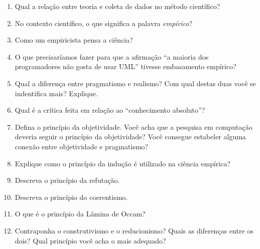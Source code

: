 \documentclass{article}
\begin{document}
\begin{enumerate}

    \item Qual a relação entre teoria e coleta de dados no método científico?
    \item No contexto científico, o que significa a palavra \textit{empírico}?
    \item Como um empiricista pensa a ciência? 
    \item O que precisaríamos fazer para que a afirmação ``a maioria dos programadores não gosta de usar UML'' tivesse embasamento empírico?
    \item Qual a diferença entre pragmatismo e realismo? Com qual destas duas você se indentifica mais? Explique.
    \item Qual é a crítica feita em relação ao ``conhecimento absoluto''?
    \item Defina o princípio da objetividade. Você acha que a pesquisa em computação deveria seguir o princípio da objetividade? Você consegue estabeler alguma conexão entre objetividade e pragmatismo?
    \item Explique como o princípio da indução é utilizado na ciência empírica?
    \item Descreva o princípio da refutação.
    \item Descreva o princípio do coerentismo.
    \item O que é o princípio da Lâmina de Occam?
    \item Contraponha o construtivismo e o reducionismo? Quais as diferenças entre os dois? Qual princípio você acha o mais adequado?

\end{enumerate}
    




%
%
\end{document}
